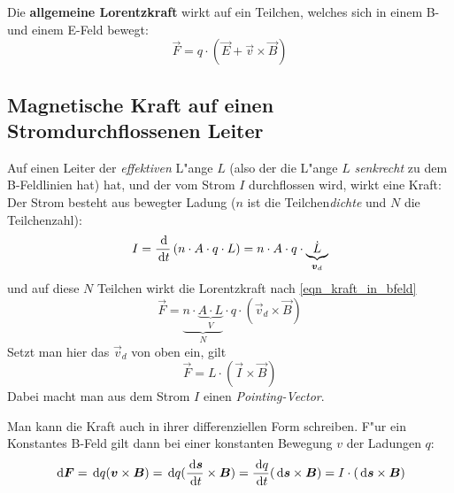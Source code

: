 \begin{Wichtig}
Die \textbf{allgemeine Lorentzkraft} wirkt auf ein Teilchen, welches
sich in einem B- und einem E-Feld bewegt:
\begin{equation}
   \label{eqn_kraft_in_E-B-Feld}
   \vec F = q \cdot \left ( \vec E + \vec v \times \vec B \right )
\end{equation}
\end{Wichtig}





\subsection{Magnetische Kraft auf einen Stromdurchflossenen Leiter}
\label{kap_magnetische-kraft-auf-einen-stromdurchflossenen}

Auf einen Leiter der \emph{effektiven} L"ange $L$ (also der die L"ange
$L$ \emph{senkrecht} zu dem B-Feldlinien hat) hat, und der vom Strom
$I$ durchflossen wird, wirkt eine Kraft: Der Strom besteht aus
bewegter Ladung ($n$ ist die Teilchen\emph{dichte} und $N$ die Teilchenzahl):
\begin{equation*}
   \label{eq:314}
   I = \frac{\, \mathrm{d} }{\, \mathrm{d} t} \left ( n \cdot A \cdot q \cdot L \right
   ) = n \cdot A \cdot q \cdot \underbrace{\dot L}_{\boldsymbol{v}_d}
\end{equation*}
und auf diese $N$ Teilchen wirkt die Lorentzkraft nach \eqref{eqn_kraft_in_bfeld}
\begin{equation*}
   \label{eq:316}
   \vec F = \underbrace{n \cdot \underbrace{A \cdot L}_V}_N \cdot q \cdot \left ( \vec v_d \times \vec B
      \right )
\end{equation*}
Setzt man hier das $\vec v_d$ von oben ein, gilt
\begin{equation}
   \label{eq:317}
   \vec F = L \cdot \left ( \vec I \times \vec B \right )
\end{equation}
Dabei macht man aus dem Strom $I$ einen \emph{Pointing-Vector}.


\bigskip

Man kann die Kraft auch in ihrer differenziellen Form schreiben. F"ur
ein Konstantes B-Feld gilt dann bei einer konstanten Bewegung $v$ der
Ladungen $q$:
\begin{equation*}
   \, \mathrm{d} \boldsymbol{F} = \, \mathrm{d} q (\boldsymbol{v} \times \boldsymbol{B}) = 
\, \mathrm{d} q (\frac{\, \mathrm{d} \boldsymbol{s}}{\, \mathrm{d} t} \times \boldsymbol{B}) =
\frac{\, \mathrm{d} q}{\, \mathrm{d} t} (\, \mathrm{d} \boldsymbol{s} \times \boldsymbol{B}) =
I \cdot (\, \mathrm{d} \boldsymbol{s} \times \boldsymbol{B})
\end{equation*}





